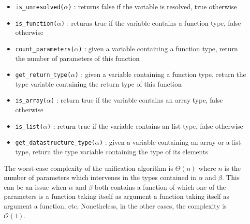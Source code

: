 \documentclass[a4paper,11pt]{article}
\begin{document}
\begin{itemize}
	\item \texttt{is\_unresolved($\alpha$)} : returns false if the variable is resolved, true otherwise 
	\item \texttt{is\_function($\alpha$)} : returns true if the variable contains a function type, false otherwise
	\item \texttt{count\_parameters($\alpha$)} : given a variable containing a function type, return the number of parameters of this function 
	\item \texttt{get\_return\_type($\alpha$)} : given a variable containing a function type, return the type variable containing the return type of this function
	\item \texttt{is\_array($\alpha$)} : return true if the variable contains an array type, false otherwise
	\item \texttt{is\_list($\alpha$)} : return true if the variable contains an list type, false otherwise 
	\item \texttt{get\_datastructure\_type($\alpha$)} : given a variable containing an array or a list type, return the type variable containing the type of its elements
\end{itemize}
The worst-case complexity of the unification algorithm is $\Theta(n)$ where $n$ is the number of parameters which intervenes in the types contained in $\alpha$ and $\beta$. This can be an issue when $\alpha$ and $\beta$ both contains a function of which one of the parameters is a function taking itself as argument a function taking itself as argument a function, etc. Nonetheless, in the other cases, the complexity is $\mathcal{O}(1)$.
\end{document}
